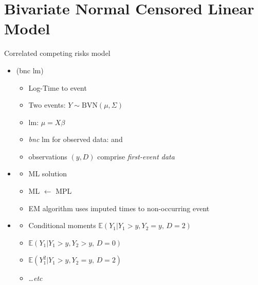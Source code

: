 \documentclass[10pt]{beamer}
\newcommand{\nologo}{\setbeamertemplate{logo}{}}
\begin{document}
  
 

\section{Bivariate Normal Censored Linear Model}

\begin{frame}{Correlated competing risks model}
  \begin{itemize}
  \item
    {\color{DarkBlue}{Bivariate Normal Censored Linear Model}} (bnc lm)
    \begin{itemize}
    \item
      Log-Time to {} event
    \item
      Two events: $Y \sim \mbox{BVN}(\mu,\Sigma) $
    \item
      lm: $\mu = X \beta$
    \item
      \emph{bnc} lm for observed data: \color{red}{$y=\min (Y_1, Y_2, C)$} and  \color{red}{$D=1,2,0$}
    \item observations $(y,D)$ comprise \emph{first-event data} 
    \end{itemize}
  \item
    {\color{DarkBlue}{Estimation}}
    \begin{itemize}
    \item ML solution 
    \item
      ML $\leftarrow$  MPL
    \item
      EM algorithm uses imputed times to non-occurring event
    \end{itemize}
  \item 
   {\color{DarkBlue}{Imputation}}
    \begin{itemize}
    \item Conditional moments
      \( \mathbb{E} (Y_1| Y_1 > y, Y_2=y, \, D=2) \)
    \item
      \( \mathbb{E} (Y_1| Y_1 > y, Y_2 > y, \, D=0) \)
    \item 
    \( \mathbb{E} (Y_1^2| Y_1> y, Y_2=y,\, D=2) \) 
    \item
    \ldots \emph{etc}
    \end{itemize}
  \end{itemize}
\end{frame}
\end{document}
